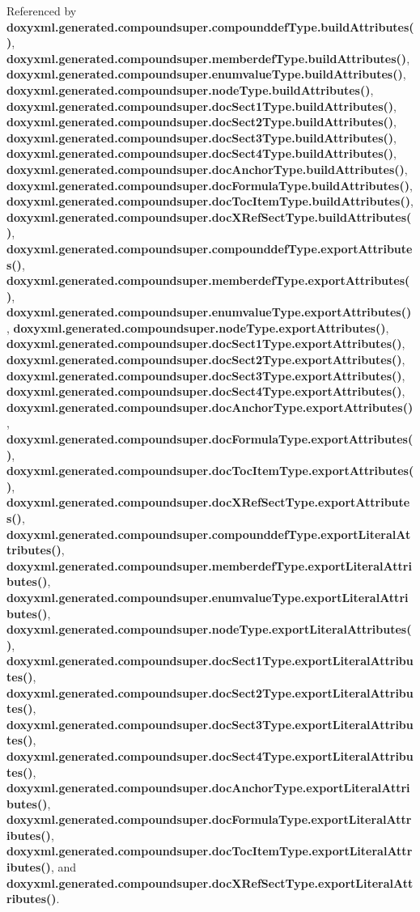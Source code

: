 Referenced by {\bf doxyxml.\+generated.\+compoundsuper.\+compounddef\+Type.\+build\+Attributes()}, {\bf doxyxml.\+generated.\+compoundsuper.\+memberdef\+Type.\+build\+Attributes()}, {\bf doxyxml.\+generated.\+compoundsuper.\+enumvalue\+Type.\+build\+Attributes()}, {\bf doxyxml.\+generated.\+compoundsuper.\+node\+Type.\+build\+Attributes()}, {\bf doxyxml.\+generated.\+compoundsuper.\+doc\+Sect1\+Type.\+build\+Attributes()}, {\bf doxyxml.\+generated.\+compoundsuper.\+doc\+Sect2\+Type.\+build\+Attributes()}, {\bf doxyxml.\+generated.\+compoundsuper.\+doc\+Sect3\+Type.\+build\+Attributes()}, {\bf doxyxml.\+generated.\+compoundsuper.\+doc\+Sect4\+Type.\+build\+Attributes()}, {\bf doxyxml.\+generated.\+compoundsuper.\+doc\+Anchor\+Type.\+build\+Attributes()}, {\bf doxyxml.\+generated.\+compoundsuper.\+doc\+Formula\+Type.\+build\+Attributes()}, {\bf doxyxml.\+generated.\+compoundsuper.\+doc\+Toc\+Item\+Type.\+build\+Attributes()}, {\bf doxyxml.\+generated.\+compoundsuper.\+doc\+X\+Ref\+Sect\+Type.\+build\+Attributes()}, {\bf doxyxml.\+generated.\+compoundsuper.\+compounddef\+Type.\+export\+Attributes()}, {\bf doxyxml.\+generated.\+compoundsuper.\+memberdef\+Type.\+export\+Attributes()}, {\bf doxyxml.\+generated.\+compoundsuper.\+enumvalue\+Type.\+export\+Attributes()}, {\bf doxyxml.\+generated.\+compoundsuper.\+node\+Type.\+export\+Attributes()}, {\bf doxyxml.\+generated.\+compoundsuper.\+doc\+Sect1\+Type.\+export\+Attributes()}, {\bf doxyxml.\+generated.\+compoundsuper.\+doc\+Sect2\+Type.\+export\+Attributes()}, {\bf doxyxml.\+generated.\+compoundsuper.\+doc\+Sect3\+Type.\+export\+Attributes()}, {\bf doxyxml.\+generated.\+compoundsuper.\+doc\+Sect4\+Type.\+export\+Attributes()}, {\bf doxyxml.\+generated.\+compoundsuper.\+doc\+Anchor\+Type.\+export\+Attributes()}, {\bf doxyxml.\+generated.\+compoundsuper.\+doc\+Formula\+Type.\+export\+Attributes()}, {\bf doxyxml.\+generated.\+compoundsuper.\+doc\+Toc\+Item\+Type.\+export\+Attributes()}, {\bf doxyxml.\+generated.\+compoundsuper.\+doc\+X\+Ref\+Sect\+Type.\+export\+Attributes()}, {\bf doxyxml.\+generated.\+compoundsuper.\+compounddef\+Type.\+export\+Literal\+Attributes()}, {\bf doxyxml.\+generated.\+compoundsuper.\+memberdef\+Type.\+export\+Literal\+Attributes()}, {\bf doxyxml.\+generated.\+compoundsuper.\+enumvalue\+Type.\+export\+Literal\+Attributes()}, {\bf doxyxml.\+generated.\+compoundsuper.\+node\+Type.\+export\+Literal\+Attributes()}, {\bf doxyxml.\+generated.\+compoundsuper.\+doc\+Sect1\+Type.\+export\+Literal\+Attributes()}, {\bf doxyxml.\+generated.\+compoundsuper.\+doc\+Sect2\+Type.\+export\+Literal\+Attributes()}, {\bf doxyxml.\+generated.\+compoundsuper.\+doc\+Sect3\+Type.\+export\+Literal\+Attributes()}, {\bf doxyxml.\+generated.\+compoundsuper.\+doc\+Sect4\+Type.\+export\+Literal\+Attributes()}, {\bf doxyxml.\+generated.\+compoundsuper.\+doc\+Anchor\+Type.\+export\+Literal\+Attributes()}, {\bf doxyxml.\+generated.\+compoundsuper.\+doc\+Formula\+Type.\+export\+Literal\+Attributes()}, {\bf doxyxml.\+generated.\+compoundsuper.\+doc\+Toc\+Item\+Type.\+export\+Literal\+Attributes()}, and {\bf doxyxml.\+generated.\+compoundsuper.\+doc\+X\+Ref\+Sect\+Type.\+export\+Literal\+Attributes()}.

